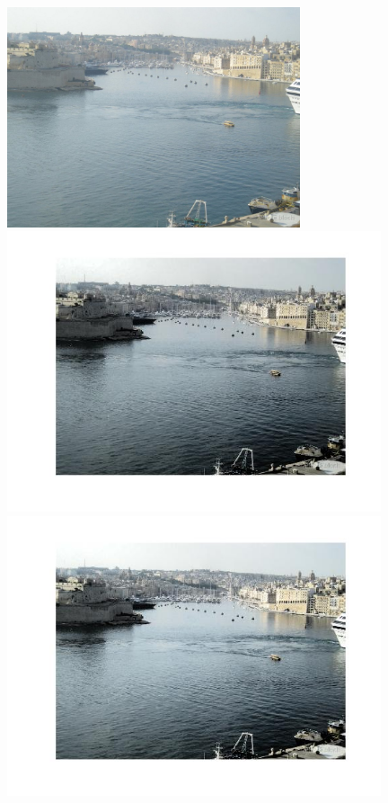 \documentclass{article}
\begin{document}
\begin{figure}[!hbt]
\centering
\begin{minipage}{0.33\textwidth}
\centering
\includegraphics[width=0.77\textwidth]{../pictures/Malta.JPG}
\end{minipage}%
\begin{minipage}{0.33\textwidth}
\centering
\includegraphics[width=0.98\textwidth]{images/im_xx.jpg}
\end{minipage}%
\begin{minipage}{0.33\textwidth}
\centering
\includegraphics[width=0.98\textwidth]{images/p3_malta_xx.jpg}

\end{minipage}
\end{figure}
\end{document}
